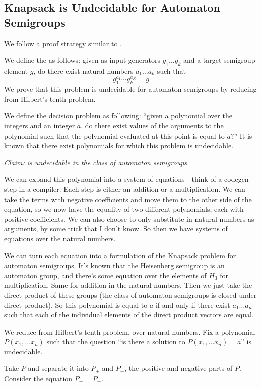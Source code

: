 \documentclass[11pt]{article}
\begin{document}
\subsection{Knapsack is Undecidable for Automaton Semigroups}
{\color{TODO}
We follow a proof strategy similar to \cite{Konig15:knapsack}.

We define the  as follows: given as input
generators $g_1 \ldots g_k$ and a target semigroup element $g$, do there
exist natural numbers $a_1\ldots a_k$ such that
\[ g_1^{a_1} \cdots g_k^{a_K} = g \] We prove that this problem is
undecidable for automaton semigroups by reducing from %
Hilbert's tenth problem.

We define the decision problem  as following: ``given
a polynomial over the integers and an integer $a$, do there exist
values of the arguments to the polynomial such that the polynomial
evaluated at this point is equal to $a$?'' It is known that there
exist polynomials for which this problem is undecidable.

\textit{Claim:  is undecidable in the class of automaton semigroups.}

We can expand this polynomial into a system of equations - think of a
codegen step in a compiler. Each step is either an addition or a
multiplication. We can take the terms with negative coefficients and
move them to the other side of the equation, so we now have the
equality of two different polynomials, each with positive
coefficients. We can also choose to only substitute in natural numbers
as arguments, by some trick that I don't know. So then we have systems
of equations over the natural numbers.

We can turn each equation into a formulation of the Knapsack problem
for automaton semigroups. It's known that the Heisenberg semigroup is
an automaton group, and there's some equation over the elements of
$H_3$ for multiplication. Same for addition in the natural
numbers. Then we just take the direct product of these groups (the
class of automaton semigroups is closed under direct product). So this
polynomial is equal to $a$ if and only if there exist $a_1 \ldots a_n$
such that each of the individual elements of the direct product
vectors are equal.

We reduce from Hilbert's tenth problem, over natural numbers. Fix a polynomial $P(x_1, \ldots x_n)$ such that the question ``is there a solution to $P(x_1, \ldots x_n) = a$'' is undecidable.



Take $P$ and separate it into $P_+$ and $P_-$, the positive and
negative parts of $P$. Consider the equation $P_+ = P_-$.
} %
\end{document}
